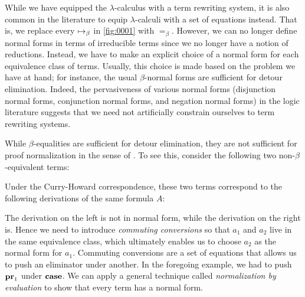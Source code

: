 \documentclass[a4paper]{article}
\begin{document}
While we have equipped the $\lambda$-calculus with a term rewriting system, it is also common in the literature to equip $\lambda$-calculi with a set of equations instead.
That is, we replace every $\bRed$ in \cref{fig:0001} with $=_{\beta}$.
However, we can no longer define normal forms in terms of irreducible terms since we no longer have a notion of reductions.
Instead, we have to make an explicit choice of a normal form for each equivalence class of terms.
Usually, this choice is made based on the problem we have at hand; for instance, the usual $\beta$-normal forms are sufficient for detour elimination.
Indeed, the pervasiveness of various normal forms (\eg disjunction normal forms, conjunction normal forms, and negation normal forms) in the logic literature suggests that we need not artificially constrain ourselves to term rewriting systems.

While $\beta$-equalities are sufficient for detour elimination, they are not sufficient for proof normalization in the sense of \cite{Negri01}.
To see this, consider the following two non-$\beta$-equivalent terms:


Under the Curry-Howard correspondence, these two terms correspond to the following derivations of the same formula $A$:


The derivation on the left is not in normal form, while the derivation on the right is.
Hence we need to introduce \emph{commuting conversions} so that $a_1$ and $a_2$ live in the same equivalence class, which ultimately enables us to choose $a_2$ as the normal form for $a_1$.
Commuting conversions are a set of equations that allows us to push an eliminator under another.
In the foregoing example, we had to push $\operatorname{\mathbf{pr}}_1$ under $\operatorname{\mathbf{case}}$.
We can apply a general technique called \emph{normalization by evaluation} \cite{Berger91,Abel07,Gratzer19} to show that every term has a normal form.
\end{document}
